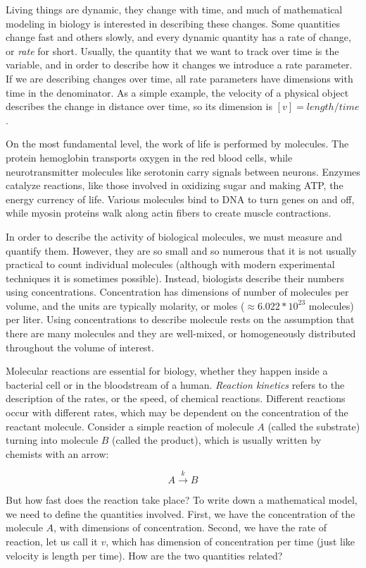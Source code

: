 \documentclass[
  letterpaper,
  DIV=11,
  numbers=noendperiod]{scrreprt}
\begin{document}
Living things are dynamic, they change with time, and much of
mathematical modeling in biology is interested in describing these
changes. Some quantities change fast and others slowly, and every
dynamic quantity has a rate of change, or \emph{rate} for short.
Usually, the quantity that we want to track over time is the variable,
and in order to describe how it changes we introduce a rate parameter.
If we are describing changes over time, all rate parameters have
dimensions with time in the denominator. As a simple example, the
velocity of a physical object describes the change in distance over
time, so its dimension is \([v] = length/time\).

On the most fundamental level, the work of life is performed by
molecules. The protein hemoglobin transports oxygen in the red blood
cells, while neurotransmitter molecules like serotonin carry signals
between neurons. Enzymes catalyze reactions, like those involved in
oxidizing sugar and making ATP, the energy currency of life. Various
molecules bind to DNA to turn genes on and off, while myosin proteins
walk along actin fibers to create muscle contractions.

In order to describe the activity of biological molecules, we must
measure and quantify them. However, they are so small and so numerous
that it is not usually practical to count individual molecules (although
with modern experimental techniques it is sometimes possible). Instead,
biologists describe their numbers using concentrations. Concentration
has dimensions of number of molecules per volume, and the units are
typically molarity, or moles (\(\approx 6.022*10^{23}\) molecules) per
liter. Using concentrations to describe molecule rests on the assumption
that there are many molecules and they are well-mixed, or homogeneously
distributed throughout the volume of interest.

Molecular reactions are essential for biology, whether they happen
inside a bacterial cell or in the bloodstream of a human. \emph{Reaction
kinetics}  refers to the description of the
rates, or the speed, of chemical reactions. Different reactions occur
with different rates, which may be dependent on the concentration of the
reactant molecule. Consider a simple reaction of molecule \(A\) (called
the substrate) turning into molecule \(B\) (called the product), which
is usually written by chemists with an arrow:

\[
  A \xrightarrow{k} B
\]

But how fast does the reaction take place? To write down a mathematical
model, we need to define the quantities involved. First, we have the
concentration of the molecule \(A\), with dimensions of concentration.
Second, we have the rate of reaction, let us call it \(v\), which has
dimension of concentration per time (just like velocity is length per
time). How are the two quantities related?
\end{document}
